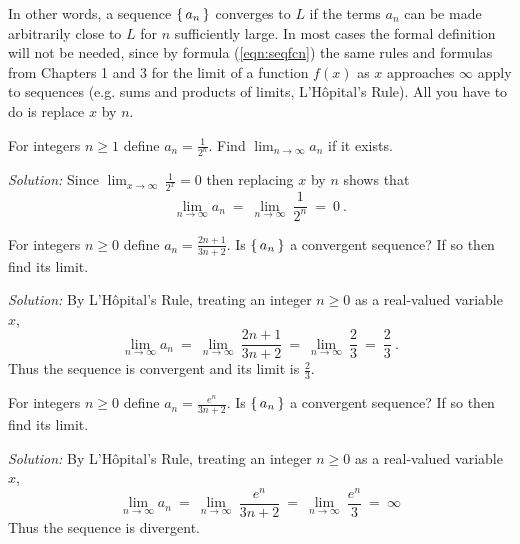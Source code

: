 In other words, a sequence $\left\lbrace\mspace{3mu}a_n\mspace{3mu}\right\rbrace$ converges to $L$ if the terms $a_n$ can
be made arbitrarily close to $L$ for $n$ sufficiently large. In most cases the
formal definition will not be needed, since by formula (\ref{eqn:seqfcn}) the
same rules and formulas from Chapters 1 and 3 for the limit of a function $f(x)$
as $x$ approaches $\infty$ apply to sequences (e.g. sums and products of limits,
L'H\^{o}pital's Rule). All you have to do is replace $x$ by $n$.

\begin{exmp}
\noindent For integers $n \ge 1$ define $a_n = \frac{1}{2^n}$. Find
$\displaystyle\lim_{n \to \infty} a_n$ if it exists.\vspace{1mm}
\par\noindent\emph{Solution:} Since
$\displaystyle\lim_{x \to \infty} \,\frac{1}{2^x} = 0$ then replacing $x$ by $n$
shows that
\[
\lim_{n \to \infty} a_n ~=~ \lim_{n \to \infty}~ \frac{1}{2^n} ~=~ 0 ~.
\]
\end{exmp}
\divider
\newpage
\begin{exmp}
\noindent For integers $n \ge 0$ define $a_n = \frac{2n+1}{3n+2}$. Is
$\left\lbrace\mspace{3mu}a_n\mspace{3mu}\right\rbrace$ a convergent sequence? If so then find its limit.\vspace{1mm}
\par\noindent\emph{Solution:} By L'H\^{o}pital's Rule, treating an integer
$n\ge 0$ as a real-valued variable $x$,
\[
\lim_{n \to \infty} a_n ~=~ \lim_{n \to \infty}~ \frac{2n+1}{3n+2} ~=~ 
\lim_{n \to \infty}~ \frac{2}{3} ~=~ \frac{2}{3} ~.
\]
Thus the sequence is convergent and its limit is $\frac{2}{3}$.
\end{exmp}
\begin{exmp}
\noindent For integers $n \ge 0$ define $a_n = \frac{e^n}{3n+2}$. Is
$\left\lbrace\mspace{3mu}a_n\mspace{3mu}\right\rbrace$ a convergent sequence? If so then find its limit.\vspace{1mm}
\par\noindent\emph{Solution:} By L'H\^{o}pital's Rule, treating an integer
$n\ge 0$ as a real-valued variable $x$,
\[
\lim_{n \to \infty} a_n ~=~ \lim_{n \to \infty}~ \frac{e^n}{3n+2} ~=~
\lim_{n \to \infty}~ \frac{e^n}{3} ~=~ \infty
\]
Thus the sequence is divergent.
\end{exmp}
